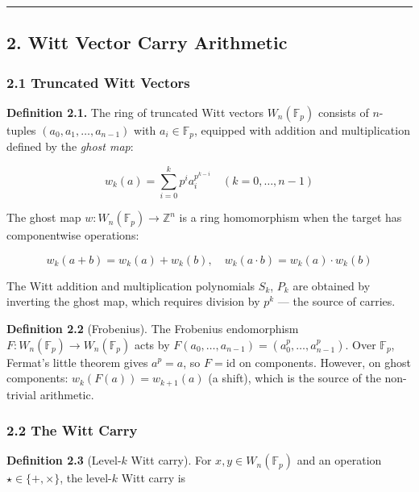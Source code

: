 \documentclass[
  11pt,
]{article}
\begin{document}
\normalsize

\begin{center}\rule{0.5\linewidth}{0.5pt}\end{center}

\newpage

\subsection{2. Witt Vector Carry Arithmetic}\label{witt-vector-carry-arithmetic}

\subsubsection{2.1 Truncated Witt Vectors}\label{truncated-witt-vectors}

\textbf{Definition 2.1.} The ring of truncated Witt vectors
\(W_n(\mathbb{F}_p)\) consists of \(n\)-tuples \((a_0, a_1, \ldots, a_{n-1})\)
with \(a_i \in \mathbb{F}_p\), equipped with addition and multiplication defined
by the \emph{ghost map}:

\[w_k(a) = \sum_{i=0}^{k} p^i a_i^{p^{k-i}} \quad (k = 0, \ldots, n-1)\]

The ghost map \(w: W_n(\mathbb{F}_p) \to \mathbb{Z}^n\) is a ring homomorphism
when the target has componentwise operations:

\[w_k(a + b) = w_k(a) + w_k(b), \quad w_k(a \cdot b) = w_k(a) \cdot w_k(b)\]

The Witt addition and multiplication polynomials \(S_k\), \(P_k\) are obtained
by inverting the ghost map, which requires division by \(p^k\) --- the source of
carries.

\textbf{Definition 2.2} (Frobenius). The Frobenius endomorphism
\(F: W_n(\mathbb{F}_p) \to W_n(\mathbb{F}_p)\) acts by
\(F(a_0, \ldots, a_{n-1}) = (a_0^p, \ldots, a_{n-1}^p)\). Over \(\mathbb{F}_p\),
Fermat's little theorem gives \(a^p = a\), so \(F = \mathrm{id}\) on components.
However, on ghost components: \(w_k(F(a)) = w_{k+1}(a)\) (a shift), which is the
source of the non-trivial arithmetic.

\subsubsection{2.2 The Witt Carry}\label{the-witt-carry}

\textbf{Definition 2.3} (Level-\(k\) Witt carry). For
\(x, y \in W_n(\mathbb{F}_p)\) and an operation
\(\star \in \lbrace{}+, \times\rbrace{}\), the level-\(k\) Witt carry is
\end{document}
